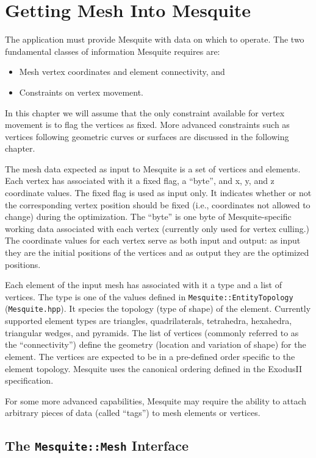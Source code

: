\chapter{Getting Mesh Into Mesquite}
\label{sec:meshes}

The application must provide Mesquite with data on which to operate.  The two
fundamental classes of information Mesquite requires are:
\begin{itemize}
\item Mesh vertex coordinates and element connectivity, and
\item Constraints on vertex movement.
\end{itemize}
In this chapter we will assume that the only constraint available for vertex movement is to flag the vertices as fixed.  More advanced constraints such as vertices following geometric curves or surfaces are discussed in the following chapter.  

The mesh data expected as input to Mesquite is a set of vertices and elements.  Each vertex has associated with it a fixed flag, a ``byte'', and x, y, and z coordinate values.  The fixed flag is used as input only.  It indicates whether or not the corresponding vertex position should be fixed (i.e., coordinates not allowed to change) during the optimization.  The ``byte'' is one byte of Mesquite-specific working data associated with each vertex (currently only used for vertex culling.)   The coordinate values for each vertex serve as both input and output: as input they are the initial positions of the vertices and as output they are the optimized positions.  

Each element of the input mesh has associated with it a type and a list of vertices.  The type is one of the values defined in \texttt{Mesquite::EntityTopology} (\texttt{Mesquite.hpp}).  It species the topology (type of shape) of the element. Currently supported element types are triangles, quadrilaterals, 
tetrahedra, hexahedra, triangular wedges, and pyramids.  The list of vertices (commonly referred to as the ``connectivity'') define the geometry (location and variation of shape) for the element.  The vertices are expected to be in a pre-defined order specific to the element topology. Mesquite uses the canonical ordering defined in the ExodusII specification\cite{exodus}.

For some more advanced capabilities, Mesquite may require the ability to attach arbitrary pieces of data (called ``tags'') to mesh elements or vertices.

\section{The \texttt{Mesquite::Mesh} Interface} \label{sec:MeshData}

